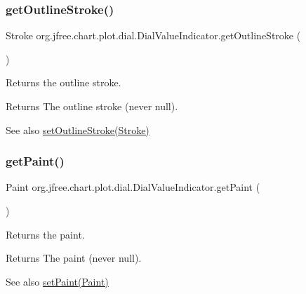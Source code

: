 \subsubsection{\texorpdfstring{get\+Outline\+Stroke()}{getOutlineStroke()}}
{\footnotesize\ttfamily Stroke org.\+jfree.\+chart.\+plot.\+dial.\+Dial\+Value\+Indicator.\+get\+Outline\+Stroke (\begin{DoxyParamCaption}{ }\end{DoxyParamCaption})}

Returns the outline stroke.

\begin{DoxyReturn}{Returns}
The outline stroke (never {\ttfamily null}).
\end{DoxyReturn}
\begin{DoxySeeAlso}{See also}
\mbox{\hyperlink{classorg_1_1jfree_1_1chart_1_1plot_1_1dial_1_1_dial_value_indicator_a011518ddf643ceb484fc659d46875123}{set\+Outline\+Stroke(\+Stroke)}} 
\end{DoxySeeAlso}
\mbox{\label{classorg_1_1jfree_1_1chart_1_1plot_1_1dial_1_1_dial_value_indicator_a5786836e013fbace6842f0bd4f1947c0}} 
\subsubsection{\texorpdfstring{get\+Paint()}{getPaint()}}
{\footnotesize\ttfamily Paint org.\+jfree.\+chart.\+plot.\+dial.\+Dial\+Value\+Indicator.\+get\+Paint (\begin{DoxyParamCaption}{ }\end{DoxyParamCaption})}

Returns the paint.

\begin{DoxyReturn}{Returns}
The paint (never {\ttfamily null}).
\end{DoxyReturn}
\begin{DoxySeeAlso}{See also}
\mbox{\hyperlink{classorg_1_1jfree_1_1chart_1_1plot_1_1dial_1_1_dial_value_indicator_a074b7cfef60b10d87247af98145343e2}{set\+Paint(\+Paint)}} 
\end{DoxySeeAlso}
\mbox{\label{classorg_1_1jfree_1_1chart_1_1plot_1_1dial_1_1_dial_value_indicator_a00272dd6350f35bbbd29f744685cb692}} 
